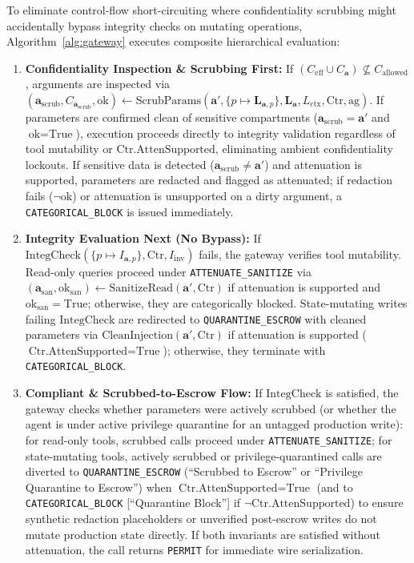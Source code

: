 \documentclass[conference,10pt]{IEEEtran}
\begin{document}
To eliminate control-flow short-circuiting where confidentiality scrubbing might accidentally bypass integrity checks on mutating operations, Algorithm~\ref{alg:gateway} executes composite hierarchical evaluation:
\begin{enumerate}
    \item \textbf{Confidentiality Inspection \& Scrubbing First:} If $(C_{\text{eff}} \cup C_{\mathbf{a}}) \not\subseteq C_{\text{allowed}}$, arguments are inspected via $(\mathbf{a}_{\text{scrub}}, C_{\mathbf{a}_{\text{scrub}}}, \text{ok}) \leftarrow \text{ScrubParams}(\mathbf{a}', \{p \mapsto \mathbf{L}_{\mathbf{a}, p}\}, \mathbf{L}_{\mathbf{a}}, L_{\text{ctx}}, \text{Ctr}, \text{ag})$. If parameters are confirmed clean of sensitive compartments ($\mathbf{a}_{\text{scrub}} = \mathbf{a}'$ and $\text{ok} = \text{True}$), execution proceeds directly to integrity validation regardless of tool mutability or $\text{Ctr.AttenSupported}$, eliminating ambient confidentiality lockouts. If sensitive data is detected ($\mathbf{a}_{\text{scrub}} \ne \mathbf{a}'$) and attenuation is supported, parameters are redacted and flagged as attenuated; if redaction fails ($\neg\text{ok}$) or attenuation is unsupported on a dirty argument, a \texttt{CATEGORICAL\_BLOCK} is issued immediately.
    \item \textbf{Integrity Evaluation Next (No Bypass):} If $\text{IntegCheck}(\{p \mapsto I_{\mathbf{a}, p}\}, \text{Ctr}, I_{\text{inv}})$ fails, the gateway verifies tool mutability. Read-only queries proceed under \texttt{ATTENUATE\_SANITIZE} via $(\mathbf{a}_{\text{san}}, \text{ok}_{\text{san}}) \leftarrow \text{SanitizeRead}(\mathbf{a}', \text{Ctr})$ if attenuation is supported and $\text{ok}_{\text{san}} = \text{True}$; otherwise, they are categorically blocked. State-mutating writes failing $\text{IntegCheck}$ are redirected to \texttt{QUARANTINE\_ESCROW} with cleaned parameters via $\text{CleanInjection}(\mathbf{a}', \text{Ctr})$ if attenuation is supported ($\text{Ctr.AttenSupported} = \text{True}$); otherwise, they terminate with \texttt{CATEGORICAL\_BLOCK}.
    \item \textbf{Compliant \& Scrubbed-to-Escrow Flow:} If $\text{IntegCheck}$ is satisfied, the gateway checks whether parameters were actively scrubbed (or whether the agent is under active privilege quarantine for an untagged production write): for read-only tools, scrubbed calls proceed under \texttt{ATTENUATE\_SANITIZE}; for state-mutating tools, actively scrubbed or privilege-quarantined calls are diverted to \texttt{QUARANTINE\_ESCROW} (``Scrubbed to Escrow'' or ``Privilege Quarantine to Escrow'') when $\text{Ctr.AttenSupported} = \text{True}$ (and to \texttt{CATEGORICAL\_BLOCK} [\textquotedblleft Quarantine Block\textquotedblright] if $\neg\text{Ctr.AttenSupported}$) to ensure synthetic redaction placeholders or unverified post-escrow writes do not mutate production state directly. If both invariants are satisfied without attenuation, the call returns \texttt{PERMIT} for immediate wire serialization.
\end{enumerate}
\end{document}
